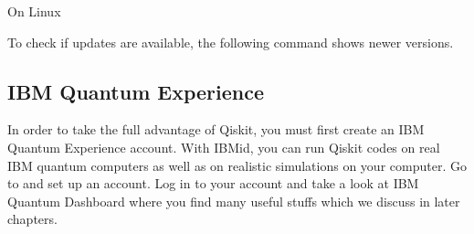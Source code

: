\documentclass[letterpaper,10pt,english]{jupyterBook}
\begin{document}
\sphinxAtStartPar
On Linux

\begin{sphinxVerbatim}[commandchars=\\\{\}]
    

                            
                        
              
                      
                      
\end{sphinxVerbatim}

\sphinxAtStartPar
To check if updates are available, the following command shows newer versions.

\begin{sphinxVerbatim}[commandchars=\\\{\}]
     

     
\end{sphinxVerbatim}


\subsection{IBM Quantum Experience}
\label{\detokenize{preparation/qiskit:ibm-quantum-experience}}
\sphinxAtStartPar
In order to take the full advantage of Qiskit, you must first create an IBM Quantum Experience account.  With IBMid, you can run Qiskit codes on real IBM quantum computers as well as on realistic simulations on your computer.  Go to
 and set up an account.
Log in to your account and take a look at IBM Quantum Dashboard where you find many useful stuffs which we discuss in later chapters.
\end{document}

